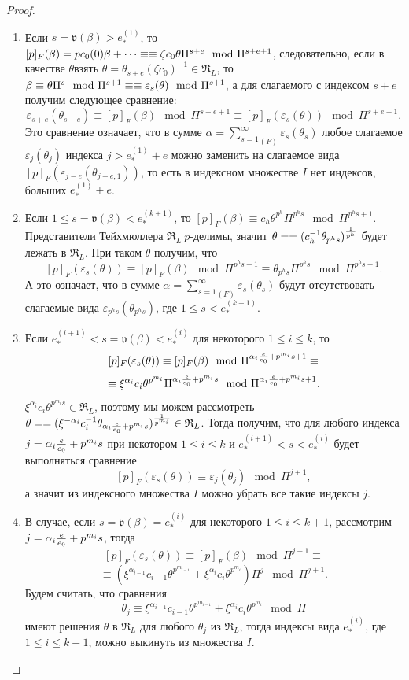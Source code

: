 \documentclass[a4paper]{article}
\newcommand{\RL}{\mathfrak{R}_L}
\newcommand{\val}{\mathfrak{v}}
\newcommand{\Leq}{\leqslant}
\begin{document}
\begin{proof}
\begin{enumerate}
\item Если $s=\val(\beta)>e_*^{(1)}$, то $[p]_F(\beta)=pc_0(0)\beta+\dots\equiv\linebreak\equiv\zeta c_0\theta\Pi^{s+e}\mod\Pi^{s+e+1}$, следовательно, если в качестве $\theta$\linebreak взять $\theta=\theta_{s+e}(\zeta c_0)^{-1}\in\RL$, то $\beta\equiv\theta\Pi^{s}\mod\Pi^{s+1}\equiv\linebreak\equiv\varepsilon_{s}(\theta)\mod\Pi^{s+1}$, а для слагаемого с индексом $s+e$ получим следующее сравнение:
$$\varepsilon_{s+e}(\theta_{s+e})\equiv[p]_F(\beta)\mod\Pi^{s+e+1}\equiv[p]_F(\varepsilon_s(\theta))\mod\Pi^{s+e+1}.$$
Это сравнение означает, что в сумме $\alpha={\sum\limits_{s=1}^\infty}_{(F)}\varepsilon_s(\theta_s)$ любое слагаемое $\varepsilon_j(\theta_j)$ индекса $j>e_*^{(1)}+e$ можно заменить на слагаемое вида $[p]_F(\varepsilon_{j-e}(\theta_{j-e,1}))$, то есть в индексном множестве $I$ нет индексов, больших $e_*^{(1)}+e$.
\item Если $1\Leq s=\val(\beta)<e_*^{(k+1)}$, то $[p]_F(\beta)\equiv c_h\theta^{p^h}\Pi^{p^hs}\mod\Pi^{p^hs+1}$. Представители Тейхмюллера $\RL\ p$-делимы, значит $\theta=\linebreak=(c_h^{-1}\theta_{p^hs})^{1\over p^h}$ будет лежать в $\RL$. При таком $\theta$ получим, что
$$[p]_F(\varepsilon_s(\theta))\equiv[p]_F(\beta)\mod\Pi^{p^hs+1}\equiv\theta_{p^hs}\Pi^{p^hs}\mod\Pi^{p^hs+1}.$$
А это означает, что в сумме $\alpha={\sum\limits_{s=1}^\infty}_{(F)}\varepsilon_s(\theta_s)$ будут отсутствовать слагаемые вида $\varepsilon_{p^hs}(\theta_{p^hs})$, где $1\Leq s<e_*^{(k+1)}$.
\item Если $e_*^{(i+1)}<s=\val(\beta)<e_*^{(i)}$ для некоторого $1\Leq i\Leq k$, то
$$[p]_F(\varepsilon_s(\theta))\equiv[p]_F(\beta)\mod\Pi^{\alpha_i{e\over e_0}+p^{m_i}s+1}\equiv$$
$$\equiv\xi^{\alpha_i}c_i\theta^{p^{m_i}}\Pi^{\alpha_i{e\over e_0}+p^{m_i}s}\mod\Pi^{\alpha_i{e\over e_0}+p^{m_i}s+1}.$$
$\xi^{\alpha_i}c_i\theta^{p^{m_i}s}\in\RL$, поэтому мы можем рассмотреть $\theta=\linebreak=(\xi^{-\alpha_i}c_i^{-1}\theta_{\alpha_i{e\over e_0}+p^{m_i}s})^{1\over p^{m_i}}\in\RL$. Тогда получим, что для любого индекса $j=\alpha_i{e\over e_0}+p^{m_i}s$ при некотором $1\Leq i\Leq k$ и $e_*^{(i+1)}<s<e_*^{(i)}$ будет выполняться сравнение
$$[p]_F(\varepsilon_s(\theta))\equiv\varepsilon_j(\theta_j)\mod\Pi^{j+1},$$
а значит из индексного множества $I$ можно убрать все такие индексы $j$.
\item В случае, если $s=\val(\beta)=e_*^{(i)}$ для некоторого $1\Leq i\Leq k+1$, рассмотрим $j=\alpha_i{e\over e_0}+p^{m_i}s$, тогда
$$[p]_F(\varepsilon_s(\theta))\equiv[p]_F(\beta)\mod\Pi^{j+1}\equiv$$
$$\equiv(\xi^{\alpha_{i-1}}c_{i-1}\theta^{p^{m_{i-1}}}+\xi^{\alpha_i}c_i\theta^{p^{m_i}})\Pi^j\mod\Pi^{j+1}.$$
Будем считать, что сравнения
$$\theta_j\equiv \xi^{\alpha_{i-1}}c_{i-1}\theta^{p^{m_{i-1}}}+\xi^{\alpha_i}c_i\theta^{p^{m_i}}\mod\Pi$$
имеют решения $\theta$ в $\RL$ для любого $\theta_j$ из $\RL$, тогда индексы вида $e_*^{(i)}$, где $1\Leq i\Leq k+1$, можно выкинуть из множества $I$.


\end{enumerate}
\end{proof}
\end{document}
